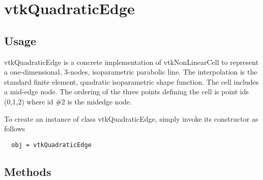 \section{vtkQuadraticEdge}

\subsection{Usage}

 vtkQuadraticEdge is a concrete implementation of vtkNonLinearCell to
 represent a one-dimensional, 3-nodes, isoparametric parabolic line. The
 interpolation is the standard finite element, quadratic isoparametric
 shape function. The cell includes a mid-edge node. The ordering of the
 three points defining the cell is point ids (0,1,2) where id \#2 is the
 midedge node.

To create an instance of class vtkQuadraticEdge, simply
invoke its constructor as follows
\begin{verbatim}
  obj = vtkQuadraticEdge
\end{verbatim}
\subsection{Methods}

